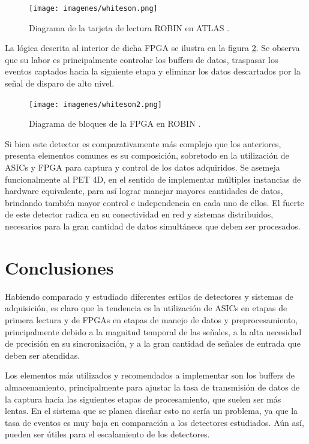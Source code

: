 \begin{figure}[H]
	\centering
	\texttt{[image: imagenes/whiteson.png]}
	\caption{Diagrama de la tarjeta de lectura ROBIN en ATLAS \cite{Whiteson2016TheSystem}.}
	\label{fig:whiteson}
\end{figure}

\newpage
\par La lógica descrita al interior de dicha FPGA se ilustra en la figura \ref{fig:whiteson2}. Se observa que su labor es principalmente controlar los buffers de datos, traspasar los eventos captados hacia la siguiente etapa y eliminar los datos descartados por la señal de disparo de alto nivel.

\begin{figure}[H]
	\centering
	\texttt{[image: imagenes/whiteson2.png]}
	\caption{Diagrama de bloques de la FPGA en ROBIN \cite{Whiteson2016TheSystem}.}
	\label{fig:whiteson2}
\end{figure}

\par Si bien este detector es comparativamente más complejo que los anteriores, presenta elementos comunes es su composición, sobretodo en la utilización de ASICs y FPGA para captura y control de los datos adquiridos. Se asemeja funcionalmente al PET 4D, en el sentido de implementar múltiples instancias de hardware equivalente, para así lograr manejar mayores cantidades de datos, brindando también mayor control e independencia en cada uno de ellos. El fuerte de este detector radica en su conectividad en red y sistemas distribuidos, necesarios para la gran cantidad de datos simultáneos que deben ser procesados. 

\newpage
\section{Conclusiones}
\par Habiendo comparado y estudiado diferentes estilos de detectores y sistemas de adquisición, es claro que la tendencia es la utilización de ASICs en etapas de primera lectura y de FPGAs en etapas de manejo de datos y preprocesamiento, principalmente debido a la magnitud temporal de las señales, a la alta necesidad de precisión en su sincronización, y a la gran cantidad de señales de entrada que deben ser atendidas.

\par Los elementos más utilizados y recomendados a implementar son los buffers de almacenamiento, principalmente para ajustar la tasa de transmisión de datos de la captura hacia las siguientes etapas de procesamiento, que suelen ser más lentas. En el sistema que se planea diseñar esto no sería un problema, ya que la tasa de eventos es muy baja en comparación a los detectores estudiados. Aún así, pueden ser útiles para el escalamiento de los detectores.

